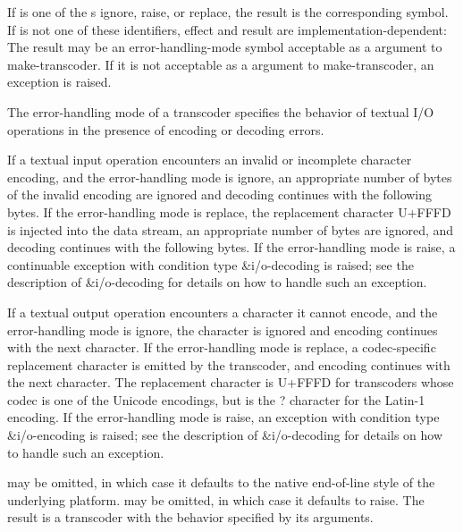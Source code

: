 \begin{entry}{%
}

If  is one of the s {\cf ignore}, {\cf
  raise}, or {\cf replace}, the result is the corresponding
symbol.  If  is not one of these identifiers, effect and
result are implementation-dependent: The result may be an
error-handling-mode symbol acceptable as a 
argument to {\cf make-transcoder}.  If it is not acceptable as a
 argument to {\cf make-transcoder}, an exception is raised.

The error-handling mode of a transcoder specifies the behavior
of textual I/O operations in the presence of encoding or decoding
errors.

If a textual input operation encounters an invalid or incomplete
character encoding, and the error-handling mode is {\cf ignore},
an appropriate number of bytes of the
invalid encoding are ignored and decoding continues with the
following bytes.
If the error-handling mode is {\cf replace}, the replacement
character U+FFFD is injected into the data stream, an appropriate
number of bytes are ignored, and decoding
continues with the following bytes.
If the error-handling mode is {\cf raise}, a continuable
exception with condition type {\cf\&i/o-decoding} is raised;
see the description of
{\cf\&i/o-decoding} for details
on how to handle such an exception.

If a textual output operation encounters a character it cannot encode,
and the error-handling mode is {\cf ignore}, the character is
ignored and encoding continues with the next character.
If the error-handling mode is {\cf replace}, a codec-specific
replacement character is emitted by the transcoder, and encoding
continues with the next character.
The replacement character is U+FFFD for transcoders whose codec
is one of the Unicode encodings, but is the {\cf ?}
character for the Latin-1 encoding.
If the error-handling mode is {\cf raise}, an
exception with condition type {\cf\&i/o-encoding} is raised;
see the description of
{\cf\&i/o-decoding} for details
on how to handle such an exception.
\end{entry}

\begin{entry}{%
}

   may be omitted, in
which case it defaults to the native end-of-line style of the
underlying platform.   may be omitted, in which
case it defaults to {\cf raise}.  The result is a transcoder with the
behavior specified by its arguments.
\end{entry}

